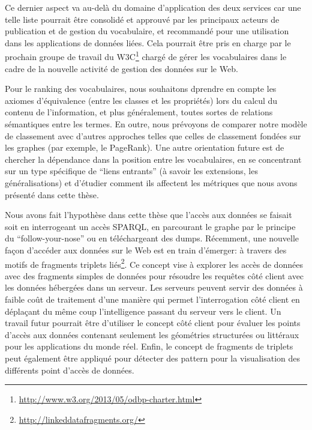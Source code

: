 Ce dernier aspect va au-delà du domaine d'application des deux services car une telle liste pourrait \^{e}tre consolid\'{e} et approuv\'{e} par les principaux acteurs de publication et de gestion du vocabulaire, et recommand\'{e} pour une utilisation dans les applications de donn\'{e}es li\'{e}es. Cela pourrait \^{e}tre pris en charge par le prochain groupe de travail du W3C\footnote{\url{http://www.w3.org/2013/05/odbp-charter.html}} charg\'{e} de g\'{e}rer les vocabulaires dans le cadre de la nouvelle activit\'{e} de gestion des donn\'{e}es sur le Web.

Pour le ranking des vocabulaires, nous souhaitons dprendre en compte les axiomes d'\'{e}quivalence (entre les classes et les propri\'{e}t\'{e}s) lors du calcul du contenu de l'information, et plus g\'{e}n\'{e}ralement, toutes sortes de relations s\'{e}mantiques entre les termes. En outre, nous pr\'{e}voyons de comparer notre mod\`{e}le de classement avec d'autres approches telles que celles de classement fond\'{e}es sur les graphes  (par exemple, le PageRank). Une autre orientation future est de chercher la d\'{e}pendance dans la position entre les vocabulaires, en se concentrant sur un type sp\'{e}cifique de ``liens entrants'' (à savoir les extensions, les g\'{e}n\'{e}ralisations) et d'\'{e}tudier comment ils affectent les m\'{e}triques que nous avons pr\'{e}sent\'{e} dans cette th\`{e}se.

Nous avons fait l'hypoth\`{e}se dans cette th\`{e}se que l'acc\`{e}s aux donn\'{e}es se faisait soit en interrogeant un acc\`{e}s SPARQL, en parcourant le graphe par le principe du ``follow-your-nose'' ou en t\'{e}l\'{e}chargeant des dumps. R\'{e}cemment, une nouvelle façon d'acc\'{e}der aux donn\'{e}es sur le Web est en train d'\'{e}merger: à travers  des motifs de fragments triplets li\'{e}s\footnote{\url{http://linkeddatafragments.org/}}. Ce concept vise à explorer les acc\`{e}s de donn\'{e}es avec des fragments simples de donn\'{e}es pour r\'{e}soudre les requ\^{e}tes côt\'{e} client avec les donn\'{e}es h\'{e}berg\'{e}es dans un serveur. Les serveurs peuvent servir des donn\'{e}es à faible coût de traitement d'une mani\`{e}re qui permet l'interrogation côt\'{e} client en d\'{e}plaçant du m\^{e}me coup l'intelligence passant du serveur vers le client. Un travail futur pourrait \^{e}tre d'utiliser le concept côt\'{e} client pour \'{e}valuer les points d'acc\`{e}s aux donn\'{e}es contenant seulement les g\'{e}om\'{e}tries structur\'{e}es ou litt\'{e}raux pour les applications du monde r\'{e}el. Enfin, le concept de fragments de triplets  peut \'{e}galement \^{e}tre appliqu\'{e} pour d\'{e}tecter des pattern pour la visualisation des diff\'{e}rents point d'acc\`{e}s de donn\'{e}es.

